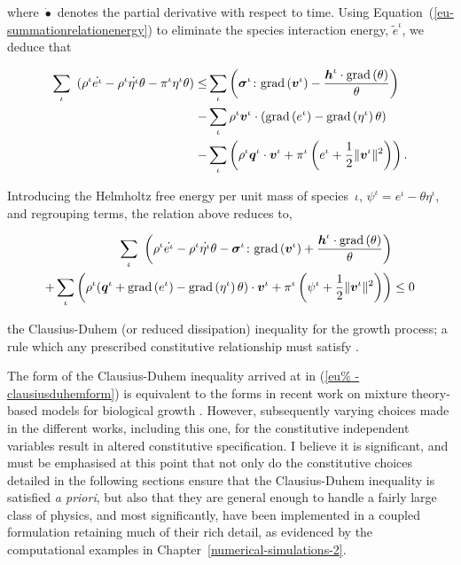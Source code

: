 \noindent where $\dot{\bullet}$ denotes the partial derivative with
respect to time. Using Equation~(\ref{eu-summationrelationenergy}) to
eliminate the species interaction energy, $\tilde{e}^{\iota}$, we
deduce that

\begin{equation*}
\begin{split}
\sum\limits_{\iota}\ \left(\rho^{\iota} \dot{e^{\iota}} - \rho^{\iota}
\dot{\eta^{\iota}} \theta - \pi^{\iota}\eta^{\iota}\theta \right) \leq
& \sum\limits_{\iota} \left(
\mbox{\boldmath$\sigma$}^{\iota}\colon\mathrm{grad}\left(\mbox{\boldmath$ v$}^{\iota}\right) -
\frac{\mbox{\boldmath$ h$}^{\iota}\cdot\mathrm{grad}\left(\theta\right)}{\theta}
\right)\ \\ -& \sum\limits_{\iota} \rho^{\iota}\mbox{\boldmath$ v$}^{\iota} \cdot\left(
\mathrm{grad} \left(e^{\iota}\right) - \mathrm{grad}\left(\eta^{\iota}
\right)\theta\right) \\ -& \sum\limits_{\iota} \left(
\rho^{\iota}\mbox{\boldmath$ q$}^{\iota}\cdot\mbox{\boldmath$ v$}^{\iota} + \pi^{\iota} \left(e^\iota +
\frac{1}{2} \Vert\mbox{\boldmath$ v$}^\iota\Vert^2\right) \right).
\end{split}
\end{equation*}

Introducing the Helmholtz free energy per unit mass of
species~$\iota$, \mbox{$\psi^\iota = e^\iota - \theta\eta^\iota$}, and
regrouping terms, the relation above reduces to,

\begin{equation}
\begin{split}
\sum\limits_{\iota}\ \bigg(\rho^{\iota} \dot{e^{\iota}} - \rho^{\iota}
\dot{\eta^{\iota}} \theta
-\mbox{\boldmath$\sigma$}^{\iota}\colon\mathrm{grad}\left(\mbox{\boldmath$ v$}^{\iota}\right) +
\frac{\mbox{\boldmath$ h$}^{\iota}\cdot\mathrm{grad}\left(\theta\right)}{\theta} \bigg)
& \\ + \sum\limits_{\iota} \left( \rho^{\iota}
(\mbox{\boldmath$ q$}^{\iota}+\mathrm{grad} \left(e^{\iota}\right) -
\mathrm{grad}\left(\eta^{\iota} \right)\theta) \cdot\mbox{\boldmath$ v$}^{\iota} +
\pi^{\iota} \left(\psi^{\iota}+\frac{1}{2}
\Vert\mbox{\boldmath$ v$}^\iota\Vert^2\right) \right) & \leq 0
\end{split}
\label{eu-clausiusduhemform}
\end{equation}

\noindent the Clausius-Duhem (or reduced dissipation) inequality for
the growth process; a rule which any prescribed constitutive
relationship must satisfy \citep{TruesdellToupin:60}.

The form of the Clausius-Duhem inequality arrived at in (\ref{eu%
-clausiusduhemform}) is equivalent to the forms in recent work
on mixture theory-based models for biological growth \citep{loret05,
  ateshian07}. However, subsequently varying choices made in the
different works, including this one, for the constitutive independent
variables result in altered constitutive specification. I believe it
is significant, and must be emphasised at this point that not only do the
constitutive choices detailed in the following sections ensure that
the Clausius-Duhem inequality is satisfied {\em a priori}, but also
that they are general enough to handle a fairly large class of
physics, and most significantly, have been implemented in a coupled
formulation retaining much of their rich detail, as evidenced by the
computational examples in Chapter~\ref{numerical-simulations-2}.

